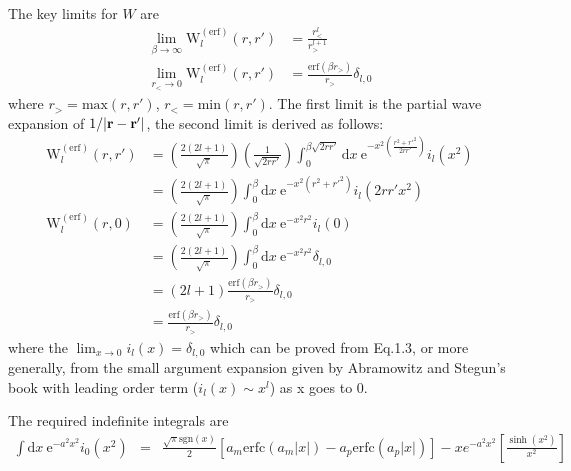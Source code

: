 \documentclass[paper=a4, fontsize=11pt]{article} %
\numberwithin{equation}{section} %
\numberwithin{figure}{section} %
\numberwithin{table}{section} %
\newcommand{\br}{{\bf{r}}}
\newcommand{\re}{{\mathrm{e}}}
\newcommand{\rerf}{{\mathrm{erf}}}
\newcommand{\rerfc}{{\mathrm{erfc}}}
\newcommand{\rd}{{\mathrm{d}}}
\newcommand{\PWerf}{\mathrm{W}^{(\mathrm{erf})}}
\newcommand{\sgn}{\mathrm{sgn}}
\newcommand{\rgt}{r_{>}}
\newcommand{\rlt}{r_{<}}
\begin{document}
The key limits for $W$ are 
\begin{equation}
\begin{split}
\lim_{\beta \rightarrow \infty}\PWerf_l(r,r')
&= \frac{\rlt^l}{\rgt^{l+1}} \\
\lim_{\rlt \rightarrow 0}\PWerf_l(r,r')
&= \frac{\rerf(\beta \rgt)}{\rgt}\delta_{l,0} 
\end{split}
\end{equation}
where $\rgt = \mathrm{max}(r,r')$, $\rlt = \mathrm{min}(r,r')$. The first limit is the partial wave expansion of $1/|\br-\br'|$, the second limit is derived as follows:
\begin{equation}
\begin{split}
\PWerf_l(r,r') &= \left(\frac{2(2l+1)}{\sqrt{\pi}}\right)\left(\frac{1}{\sqrt{2rr'}}\right) \int_0^{\beta\sqrt{2rr'}}\rd x\ \re^{-x^2\left(\frac{r^2 + r'^2}{2rr'}\right)}i_{l}(x^2)\\
&= \left(\frac{2(2l+1)}{\sqrt{\pi}}\right) \int_0^{\beta}\rd x\ \re^{-x^2\left(r^2 + r'^2\right)}i_{l}(2 rr' x^2)\\
\PWerf_l(r,0) 
&= \left(\frac{2(2l+1)}{\sqrt{\pi}}\right) \int_0^{\beta}\rd x\ \re^{-x^2 r^2 }i_{l}(0)\\
&= \left(\frac{2(2l+1)}{\sqrt{\pi}}\right) \int_0^{\beta}\rd x\ \re^{-x^2 r^2 }\delta_{l,0}\\
&= (2l+1) \frac{\rerf(\beta \rgt)}{\rgt}\delta_{l,0} \\
&= \frac{\rerf(\beta \rgt)}{\rgt}\delta_{l,0}
\end{split}
\end{equation}
where the $\lim_{x \rightarrow 0} i_l(x) = \delta_{l,0}$ which can be proved from Eq.1.3, or more generally, from the small argument expansion given by Abramowitz and Stegun's book with leading order term ($i_l(x) \sim x^l$) as x goes to 0.

The required indefinite integrals are
\begin{eqnarray}
\int \rd x\ \re^{-a^2x^2}i_{0}(x^2)&=& 
\frac{\sqrt{\pi}\sgn(x)}{2}\left [a_m \rerfc(a_m |x|) - a_p \rerfc(a_p |x|) \right ] 
- xe^{-a^2x^2} \left [\frac{\sinh(x^2)}{x^2}\right]
\end{eqnarray}
\end{document}
